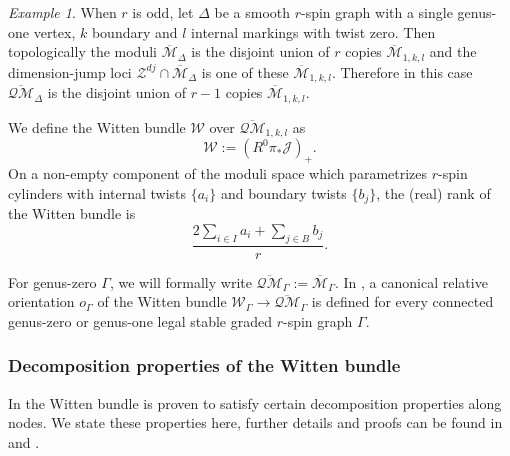 \documentclass[11pt]{amsart}
\theoremstyle{definition}
\theoremstyle{remark}
\newtheorem{ex}[dummy]{Example}
\newcommand{\oQMb}{{\overline{\mathcal{QM}}}}
\newcommand{\<}{\left<}
\renewcommand{\>}{\right>}
\numberwithin{equation}{section}
\def\Mbar{{\overline{\mathcal M}}}
\begin{document}
\begin{ex}
    When $r$ is odd, let $\Delta$ be a smooth $r$-spin graph with a single genus-one vertex, $k$ boundary and $l$ internal markings with twist zero. Then topologically the moduli $\Mbar_\Delta$ is the disjoint union of $r$ copies  $\Mbar_{1,k,l}$ and the dimension-jump loci $\mathcal Z^{dj}\cap\Mbar_\Delta$ is one of these $\Mbar_{1,k,l}$. Therefore in this case $\oQMb_\Delta$ is the disjoint union of $r-1$ copies  $\Mbar_{1,k,l}$.
\end{ex}

We define the Witten  bundle  $\mathcal W$ over $\oQMb_{1,k,l}$ as 
$${\mathcal{W}}:= (R^0\pi_*\mathcal{J})_+.$$
On a non-empty component of the moduli space which parametrizes $r$-spin cylinders with internal twists $\{a_i\}$ and boundary twists $\{b_j\}$, the (real) rank of the Witten bundle is
\begin{equation}\label{eq rank of witten bundle g=1}\frac{2 \sum_{i\in I} a_i + \sum_{j\in B} b_j }{r}.\end{equation}



For genus-zero $\Gamma$, we will formally write $\oQMb_\Gamma:=\Mbar_{\Gamma}$. 
In \cite[\S 3.2]{TZ1}, a canonical relative orientation $o_\Gamma$ of the Witten bundle $\mathcal W_\Gamma \to \oQMb_\Gamma$ is defined for every connected genus-zero or genus-one legal stable graded $r$-spin graph $\Gamma$.





\subsubsection{Decomposition properties of the Witten bundle}\label{subsec decomp}
In \cite{BCT1,TZ1} the Witten bundle is proven to satisfy certain decomposition properties along nodes.  We state these properties here, further details and proofs can be found in \cite{TZ1} and \cite[\S 4.2]{BCT1}.
\end{document}

